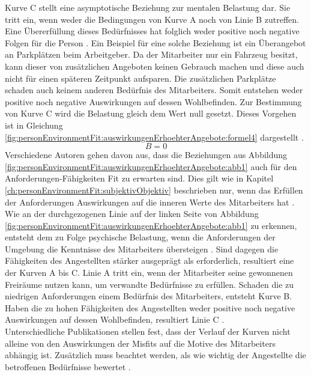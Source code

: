 Kurve C stellt eine asymptotische Beziehung zur mentalen Belastung dar. Sie tritt ein, wenn weder die Bedingungen von Kurve A noch von Linie B zutreffen. Eine Übererfüllung dieses Bedürfnisses hat folglich weder positive noch negative Folgen für die Person \cite{mechanismsOfJobStressAndStrain:1982}. Ein Beispiel für eine solche Beziehung ist ein Überangebot an Parkplätzen beim Arbeitgeber. Da der Mitarbeiter nur ein Fahrzeug besitzt, kann dieser von zusätzlichen Angeboten keinen Gebrauch machen und diese auch nicht für einen späteren Zeitpunkt aufsparen. Die zusätzlichen Parkplätze schaden auch keinem anderen Bedürfnis des Mitarbeiters. Somit entstehen weder positive noch negative Auswirkungen auf dessen Wohlbefinden. Zur Bestimmung von Kurve C wird die Belastung gleich dem Wert null gesetzt. Dieses Vorgehen ist in Gleichung \ref{fig:personEnvironmentFit:auswirkungenErhoehterAngebote:formel4} dargestellt \cite[S. 2]{edwards:1993}.
\begin{equation}
	B = 0
	\label{fig:personEnvironmentFit:auswirkungenErhoehterAngebote:formel4}
\end{equation}
Verschiedene Autoren gehen davon aus, dass die Beziehungen aus Abbildung \ref{fig:personEnvironmentFit:auswirkungenErhoehterAngebote:abb1} auch für den Anforderungen-Fähigkeiten Fit zu erwarten sind. Dies gilt wie in Kapitel \ref{ch:personEnvironmentFit:subjektivObjektiv} beschrieben nur, wenn das Erfüllen der Anforderungen Auswirkungen auf die inneren Werte des Mitarbeiters hat \cite{mechanismsOfJobStressAndStrain:1982, harrison:1978}.\\
Wie an der durchgezogenen Linie auf der linken Seite von Abbildung \ref{fig:personEnvironmentFit:auswirkungenErhoehterAngebote:abb1} zu erkennen, entsteht dem zu Folge psychische Belastung, wenn die Anforderungen der Umgebung die Kenntnisse des Mitarbeiters übersteigen \cite[S. 5]{schuler:1980}. Sind dagegen die Fähigkeiten des Angestellten stärker ausgeprägt als erforderlich, resultiert eine der Kurven A bis C. Linie A tritt ein, wenn der Mitarbeiter seine gewonnenen Freiräume nutzen kann, um verwandte Bedürfnisse zu erfüllen. Schaden die zu niedrigen Anforderungen einem Bedürfnis des Mitarbeiters, entsteht Kurve B. Haben die zu hohen Fähigkeiten des Angestellten weder positive noch negative Auswirkungen auf dessen Wohlbefinden, resultiert Linie C \cite[S. 22f.]{edwards:2008}.\\
Unterschiedliche Publikationen stellen fest, dass der Verlauf der Kurven nicht alleine von den Auswirkungen der Misfits auf die Motive des Mitarbeiters abhängig ist. Zusätzlich muss beachtet werden, als wie wichtig der Angestellte die betroffenen Bedürfnisse bewertet \cite[S. 9f.]{edwards:1996}. 

